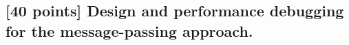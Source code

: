 \documentclass[letterpaper,11pt]{exam}
\begin{document}
\begin{questions}
    \question
    \subsection*{[40 points] Design and performance debugging for the message-passing approach.}




\end{questions}
\end{document}
